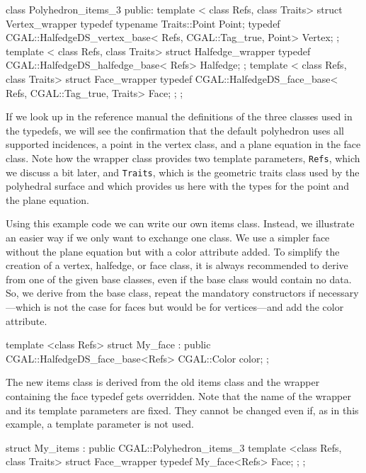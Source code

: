 \begin{ccExampleCode}
class Polyhedron_items_3 {
public:
    template < class Refs, class Traits>
    struct Vertex_wrapper {
        typedef typename Traits::Point Point;
        typedef CGAL::HalfedgeDS_vertex_base< Refs, CGAL::Tag_true, Point> Vertex;
    };
    template < class Refs, class Traits>
    struct Halfedge_wrapper {
        typedef CGAL::HalfedgeDS_halfedge_base< Refs> Halfedge;
    };
    template < class Refs, class Traits>
    struct Face_wrapper {
        typedef CGAL::HalfedgeDS_face_base< Refs, CGAL::Tag_true, Traits> Face;
    };
};
\end{ccExampleCode}

If we look up in the reference manual the definitions of the three
classes used in the typedefs, we will see the confirmation that the
default polyhedron uses all supported incidences, a point in the
vertex class, and a plane equation in the face class. Note how the
wrapper class provides two template parameters, \texttt{Refs}, which
we discuss a bit later, and \texttt{Traits}, which is the geometric
traits class used by the polyhedral surface and which provides us here
with the types for the point and the plane equation.

Using this example code we can write our own items class. Instead, we
illustrate an easier way if we only want to exchange one class. We use
a simpler face without the plane equation but with a color attribute
added. To simplify the creation of a vertex, halfedge, or face class,
it is always recommended to derive from one of the given base classes,
even if the base class would contain no data. So, we derive from the
base class, repeat the mandatory constructors if necessary---which is
not the case for faces but would be for vertices---and add the color
attribute.

\begin{ccExampleCode}
template <class Refs>
struct My_face : public CGAL::HalfedgeDS_face_base<Refs> {
    CGAL::Color color;
};
\end{ccExampleCode}

The new items class is derived from the old items class and the
wrapper containing the face typedef gets overridden. Note that the
name of the wrapper and its template parameters are fixed. They cannot
be changed even if, as in this example, a template parameter is not
used.

\begin{ccExampleCode}
struct My_items : public CGAL::Polyhedron_items_3 {
    template <class Refs, class Traits>
    struct Face_wrapper {
        typedef My_face<Refs> Face;
    };
};
\end{ccExampleCode}

